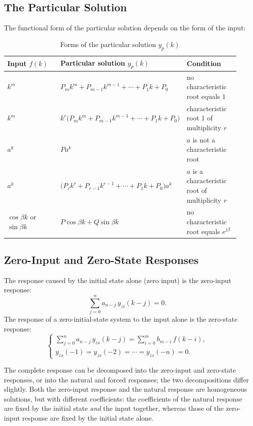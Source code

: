 \subsection{The Particular Solution}

The functional form of the particular solution depends on the form of the
input:

\begin{table}[htbp]
\centering
\caption{Forms of the particular solution $y_p(k)$}
\small
\begin{tabular}{@{}p{0.28\linewidth}p{0.42\linewidth}p{0.24\linewidth}@{}}
\toprule
Input $f(k)$ & Particular solution $y_p(k)$ & Condition \\
\midrule
$k^{m}$ & $P_mk^{m}+P_{m-1}k^{m-1}+\cdots+P_1k+P_0$ & no characteristic root equals $1$ \\
$k^{m}$ & $k^{r}\bigl(P_mk^{m}+P_{m-1}k^{m-1}+\cdots+P_1k+P_0\bigr)$ & characteristic root $1$ of multiplicity $r$ \\
$a^{k}$ & $Pa^{k}$ & $a$ is not a characteristic root \\
$a^{k}$ & $\bigl(P_rk^{r}+P_{r-1}k^{r-1}+\cdots+P_1k+P_0\bigr)a^{k}$ & $a$ is a characteristic root of multiplicity $r$ \\
$\cos\beta k$ or $\sin\beta k$ & $P\cos\beta k+Q\sin\beta k$ & no characteristic root equals $e^{j\beta}$ \\
\bottomrule
\end{tabular}
\end{table}

\subsection{Zero-Input and Zero-State Responses}

The response caused by the initial state alone (zero input) is the zero-input
response:
\[
    \sum_{j=0}^{n}a_{n-j}\,y_{zi}(k-j)=0 .
\]
The response of a zero-initial-state system to the input alone is the
zero-state response:
\[
    \begin{cases}
        \displaystyle\sum_{j=0}^{n}a_{n-j}\,y_{zs}(k-j)=\sum_{i=0}^{m}b_{m-i}\,f(k-i),\\[8pt]
        y_{zs}(-1)=y_{zs}(-2)=\cdots=y_{zs}(-n)=0 .
    \end{cases}
\]

\begin{note}
The complete response can be decomposed into the zero-input and zero-state
responses, or into the natural and forced responses; the two decompositions
differ slightly. Both the zero-input response and the natural response are
homogeneous solutions, but with different coefficients: the coefficients of
the natural response are fixed by the initial state \emph{and} the input
together, whereas those of the zero-input response are fixed by the initial
state alone.
\end{note}

